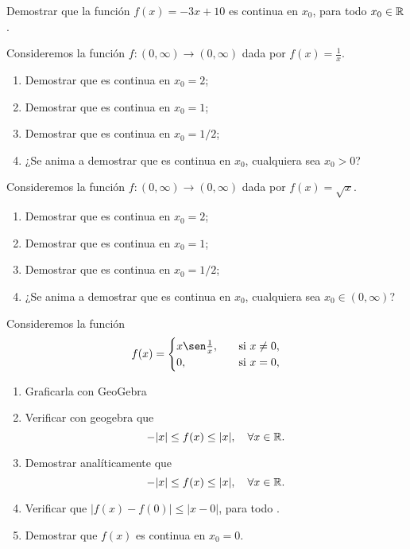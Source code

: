 \item Demostrar que la función $f(x)=-3x+10$ es continua en $x_0$, para todo $x_0\in\mathbb{R}$.

\item 
Consideremos la función $f:(0,\infty)\to(0,\infty)$ dada por
$f(x)=\frac1x$.
\begin{enumerate}
    \item Demostrar que es continua en $x_0=2$;
    \item Demostrar que es continua en $x_0=1$;
    \item Demostrar que es continua en $x_0=1/2$;
    \item ¿Se anima a demostrar que es continua en $x_0$, cualquiera sea  $x_0>0$?
\end{enumerate}

\item 
Consideremos la función $f:(0,\infty)\to(0,\infty)$ dada por
$f(x)=\sqrt x$.
\begin{enumerate}
    \item Demostrar que es continua en $x_0=2$;
    \item Demostrar que es continua en $x_0=1$;
    \item Demostrar que es continua en $x_0=1/2$;
    \item ¿Se anima a demostrar que es continua en $x_0$, cualquiera sea $x_0\in(0,\infty)$?
\end{enumerate}

\item 
Consideremos la función 
\[
f(x) = \begin{cases}
    x\sen \frac1x,\quad &\text{si $x\neq 0$},
    \\
    0,\quad &\text{si $x = 0$},
    \end{cases}
\]
\begin{enumerate}
    \item Graficarla con GeoGebra
    \item Verificar con geogebra que 
    \[
    -|x| \le f(x) \le |x|,\quad \forall{\ensuremath{x\in\mathbb{R}}}.
    \]
    \item Demostrar analíticamente que 
    \[
    -|x| \le f(x) \le |x|,\quad \forall{\ensuremath{x\in\mathbb{R}}}.
    \]
    \item Verificar que $|f(x)-f(0)|\le |x-0|$, para todo \xiR.
    \item Demostrar que $f(x)$ es continua en $x_0=0$.
\end{enumerate}

